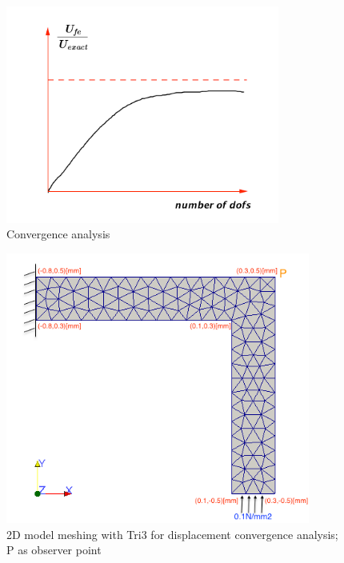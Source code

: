 \begin{figure}[htbp]
	\begin{center}	
		\includegraphics[width=9cm,clip]{convergence.pdf} 			
		\caption{Convergence analysis} \label{fig: convergence}
	\end{center}
\end{figure}


\begin{figure}[htbp]
	\begin{center}	
		\includegraphics[width=10cm,clip]{Convergence2D.png} 			
		\caption{2D model meshing with Tri3 for displacement convergence analysis; P as observer point} \label{fig: Convergence2D}
	\end{center}
\end{figure}

